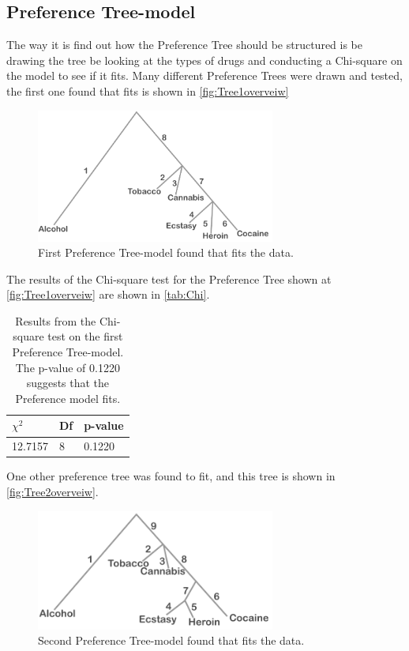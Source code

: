 \subsection*{Preference Tree-model}
The way it is find out how the Preference Tree should be structured is be drawing the tree be looking at the types of drugs and conducting a Chi-square on the model to see if it fits. Many different Preference Trees were drawn and tested, the first one found that fits is shown in \autoref{fig:Tree1overveiw}
%
\begin{figure}[H]
\centering
\includegraphics[width = 0.7\textwidth]{Figure/Tree1overview}
\caption{First Preference Tree-model found that fits the data.}
\label{fig:Tree1overveiw}
\end{figure}
\noindent
%
The results of the Chi-square test for the Preference Tree shown at \autoref{fig:Tree1overveiw} are shown in \autoref{tab:Chi}. 
%
\begin{table}[H]
\centering
\begin{tabular}{@{}lll@{}}
\toprule
$\chi^{2}$   & Df  & p-value \\ \midrule
12.7157      & 8   & 0.1220  \\ \bottomrule
\end{tabular}
\caption{Results from the Chi-square test on the first Preference Tree-model. The p-value of 0.1220 suggests that the Preference model fits.}
\label{tab:Chi1}
\end{table} 
\noindent
%
One other preference tree was found to fit, and this tree is shown in \autoref{fig:Tree2overveiw}. 
%
\begin{figure}[H]
\centering
\includegraphics[width = 0.7\textwidth]{Figure/Tree2overview}
\caption{Second Preference Tree-model found that fits the data.}
\label{fig:Tree2overveiw}
\end{figure}
